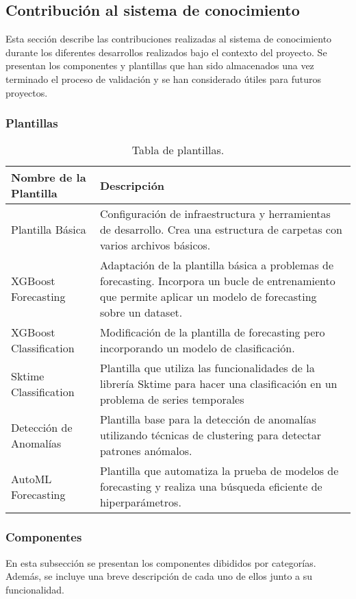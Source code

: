 \subsection{Contribución al sistema de conocimiento}
Esta sección describe las contribuciones realizadas al sistema de conocimiento
durante los diferentes desarrollos realizados bajo el contexto del proyecto. 
Se presentan los componentes y plantillas que han sido almacenados una vez
terminado el proceso de validación y se han considerado útiles para futuros
proyectos.

\subsubsection{Plantillas}
\begin{table}[h!]
    \centering
    \begin{tabular}{| m{4cm} | m{8cm} |}
      \hline
      \textbf{Nombre de la Plantilla} & \textbf{Descripción} \\ 
      \hline
      Plantilla Básica & Configuración de infraestructura y herramientas de desarrollo.
      Crea una estructura de carpetas con varios archivos básicos. \\ 
      \hline
      XGBoost Forecasting & Adaptación de la plantilla básica a problemas de forecasting.
      Incorpora un bucle de entrenamiento que permite aplicar un modelo de forecasting sobre un dataset.\\ 
      \hline
      XGBoost Classification & Modificación de la plantilla de forecasting pero incorporando un modelo
      de clasificación.\\ 
      \hline
      Sktime Classification & Plantilla que utiliza las funcionalidades de la librería 
      Sktime para hacer una clasificación en un problema de series temporales \\ 
      \hline
      Detección de Anomalías & Plantilla base para la detección de anomalías 
      utilizando técnicas de clustering para detectar patrones anómalos.\\ 
      \hline
      AutoML Forecasting &  Plantilla que automatiza la prueba de modelos 
      de forecasting y realiza una búsqueda eficiente de hiperparámetros.\\ 
      \hline
    \end{tabular}
    \caption{Tabla de plantillas.}
    \label{table:templates}
\end{table}

\subsubsection{Componentes}
En esta subsección se presentan los componentes dibididos por categorías.
Además, se incluye una breve descripción de cada uno de ellos junto a su funcionalidad.

